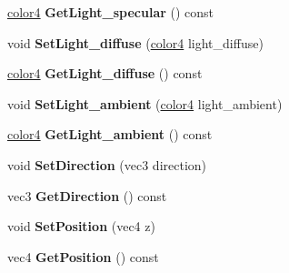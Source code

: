 \begin{DoxyCompactItemize}
\item 
\hypertarget{class_light_source_ab91668c8a2b5e9af25df5e96aef8f930}{\hyperlink{struct_angel_1_1vec4}{color4} {\bfseries \-Get\-Light\-\_\-specular} () const }\label{class_light_source_ab91668c8a2b5e9af25df5e96aef8f930}

\item 
\hypertarget{class_light_source_ab82544f5701c1d8b0fc4c2e052ed8a18}{void {\bfseries \-Set\-Light\-\_\-diffuse} (\hyperlink{struct_angel_1_1vec4}{color4} light\-\_\-diffuse)}\label{class_light_source_ab82544f5701c1d8b0fc4c2e052ed8a18}

\item 
\hypertarget{class_light_source_a3b1b4a97762e1cbb51c529166c82f657}{\hyperlink{struct_angel_1_1vec4}{color4} {\bfseries \-Get\-Light\-\_\-diffuse} () const }\label{class_light_source_a3b1b4a97762e1cbb51c529166c82f657}

\item 
\hypertarget{class_light_source_a61ebe99a604c6519d0e7e785dd26f004}{void {\bfseries \-Set\-Light\-\_\-ambient} (\hyperlink{struct_angel_1_1vec4}{color4} light\-\_\-ambient)}\label{class_light_source_a61ebe99a604c6519d0e7e785dd26f004}

\item 
\hypertarget{class_light_source_a87b3948456c4d45caa24b7cdd1e02058}{\hyperlink{struct_angel_1_1vec4}{color4} {\bfseries \-Get\-Light\-\_\-ambient} () const }\label{class_light_source_a87b3948456c4d45caa24b7cdd1e02058}

\item 
\hypertarget{class_light_source_a61eee0b1deb3c4f5835411680f3e8dd5}{void {\bfseries \-Set\-Direction} (vec3 direction)}\label{class_light_source_a61eee0b1deb3c4f5835411680f3e8dd5}

\item 
\hypertarget{class_light_source_a42a8e0e812de7b1236bb8e3171b98954}{vec3 {\bfseries \-Get\-Direction} () const }\label{class_light_source_a42a8e0e812de7b1236bb8e3171b98954}

\item 
\hypertarget{class_light_source_a99f1a22e8732f83bfd852002ec060735}{void {\bfseries \-Set\-Position} (vec4 z)}\label{class_light_source_a99f1a22e8732f83bfd852002ec060735}

\item 
\hypertarget{class_light_source_a6138846124ad72588cdab459516a5f1d}{vec4 {\bfseries \-Get\-Position} () const }\label{class_light_source_a6138846124ad72588cdab459516a5f1d}


\end{DoxyCompactItemize}
